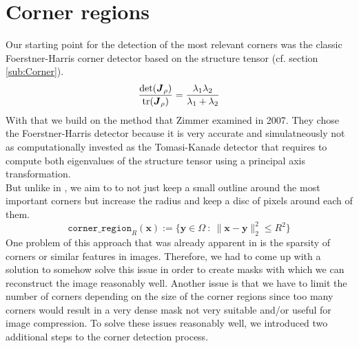 \section{Corner regions}
Our starting point for the detection of the most relevant corners was the classic Foerstner-Harris
corner detector based on the structure tensor (cf. section \ref{sub:Corner}). 
\begin{equation}
    \frac{\textnormal{det}(\boldsymbol J_\rho)}{\textnormal{tr}(\boldsymbol J_\rho)} =
    \frac{\lambda_1\lambda_2}{\lambda_1 + \lambda_2}\label{def:Harris}
\end{equation}
With that we build on the method that Zimmer \cite{zimmer07} examined in 2007. They chose the
Foerstner-Harris detector because it is very accurate and simulatneously not as computationally
invested as the Tomasi-Kanade detector that requires to compute both eigenvalues of the structure
tensor using a principal axis transformation.\\
But unlike in \cite{zimmer07}, we aim to to not just keep a small outline around the most important
corners but increase the radius and keep a disc of pixels around each of them. 
\begin{equation}
    \texttt{corner\_region}_R(\boldsymbol x) := \lbrace \boldsymbol y \in \Omega\ : \ \lVert \boldsymbol
    x - \boldsymbol y\rVert_2^2 \leq R^2 \rbrace
\end{equation}
One problem of this approach that was already apparent in \cite{zimmer07} is the sparsity of
corners or similar features in images. Therefore, we had to come up with a solution to somehow
solve this issue in order to create masks with which we can reconstruct the image reasonably 
well.
Another issue is that we have to limit the number of corners depending on the size of the corner
regions since too many corners would result in a very dense mask not very suitable and/or
useful for image compression. 
To solve these issues reasonably well, we introduced two additional steps to the corner detection
process.
